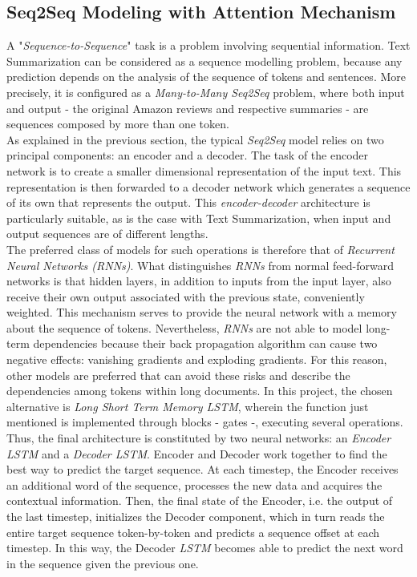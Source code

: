 \documentclass[fleqn,10pt]{SelfArx} %
\begin{document}
\subsection{Seq2Seq Modeling with Attention Mechanism}
A "\textit{Sequence-to-Sequence}" task is a problem involving sequential information. Text Summarization can be considered as a sequence modelling problem, because any prediction depends on the analysis of the sequence of tokens and sentences. More precisely, it is configured as a \textit{Many-to-Many Seq2Seq} problem, where both input and output - the original Amazon reviews and respective summaries - are sequences composed by more than one token.\\
As explained in the previous section, the typical \textit{Seq2Seq} model relies on two principal components: an encoder and a decoder. The task of the encoder network is to create a smaller dimensional representation of the input text. This representation is then forwarded to a decoder network which generates a sequence of its own that represents the output. This \textit{encoder-decoder} architecture is particularly suitable, as is the case with Text Summarization, when input and output sequences are of different lengths.\\
The preferred class of models for such operations is therefore that of \textit{Recurrent Neural Networks (RNNs)}. What distinguishes \textit{RNNs} from normal feed-forward networks is that hidden layers, in addition to inputs from the input layer, also receive their own output associated with the previous state, conveniently weighted. This mechanism serves to provide the neural network with a memory about the sequence of tokens. Nevertheless, \textit{RNNs} are not able to model long-term dependencies because their back propagation algorithm can cause two negative effects: vanishing gradients and exploding gradients. For this reason, other models are preferred that can avoid these risks and describe the dependencies among tokens within long documents. In this project, the chosen alternative is \textit{Long Short Term Memory LSTM}, wherein the function just mentioned is implemented through blocks - gates -, executing several operations.\\ Thus, the final architecture is constituted by two neural networks: an \textit{Encoder LSTM} and a \textit{Decoder LSTM}. Encoder and Decoder work together to find the best way to predict the target sequence. At each timestep, the Encoder receives an additional word of the sequence, processes the new data and acquires the contextual information. Then, the final state of the Encoder, i.e. the output of the last timestep, initializes the Decoder component, which in turn reads the entire target sequence token-by-token and predicts a sequence offset at each timestep. In this way, the Decoder \textit{LSTM} becomes able to predict the next word in the sequence given the previous one.\\
\end{document}

